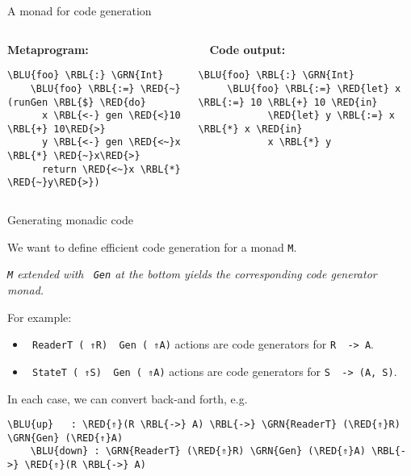 \documentclass[dvipsnames,aspectratio=169]{beamer}
\theoremstyle{remark}
\newcommand{\RED}[1]{{\color{BrickRed} #1}}
\newcommand{\GRN}[1]{{\color{OliveGreen} #1}}
\newcommand{\RBL}[1]{{\color{RoyalBlue} #1}}
\newcommand{\BLU}[1]{{\color{Blue} #1}}
\begin{document}
\begin{frame}[fragile]{A monad for code generation}

\begin{columns}
\begin{column}{0.4\textwidth}
\textbf{Metaprogram:}
\begin{Verbatim}[commandchars=\\\{\}]
    \BLU{foo} \RBL{:} \GRN{Int}
    \BLU{foo} \RBL{:=} \RED{~}(runGen \RBL{$} \RED{do}
      x \RBL{<-} gen \RED{<}10 \RBL{+} 10\RED{>}
      y \RBL{<-} gen \RED{<~}x \RBL{*} \RED{~}x\RED{>}
      return \RED{<~}x \RBL{*} \RED{~}y\RED{>})
\end{Verbatim}
\end{column}

\begin{column}{0.5\textwidth}
\textbf{$\hspace{1em}$Code output:}
\begin{Verbatim}[commandchars=\\\{\}]
     \BLU{foo} \RBL{:} \GRN{Int}
     \BLU{foo} \RBL{:=} \RED{let} x \RBL{:=} 10 \RBL{+} 10 \RED{in}
            \RED{let} y \RBL{:=} x \RBL{*} x \RED{in}
            x \RBL{*} y

\end{Verbatim}
\end{column}
\end{columns}

\end{frame}

\begin{frame}[fragile]{Generating monadic code}

We want to define efficient code generation for a monad \texttt{M}.
{\center
\begin{block}{}
\center\emph{\texttt{M} extended with \texttt{\GRN{Gen}} at the bottom yields
the corresponding code generator monad.}
\end{block}}

\vspace{1em}

For example:
\begin{itemize}
\item \texttt{\GRN{ReaderT} (\RED{⇑}R) \GRN{Gen} (\RED{⇑}A)} actions
      are code generators for \texttt{R \RBL{->} A}.
\item \texttt{\GRN{StateT} (\RED{⇑}S) \GRN{Gen} (\RED{⇑}A)} actions
      are code generators for \texttt{S \RBL{->} (A, S)}.
\end{itemize}
\vspace{0.5em}
In each case, we can convert back-and forth, e.g.\
\begin{Verbatim}[commandchars=\\\{\}]
    \BLU{up}   : \RED{⇑}(R \RBL{->} A) \RBL{->} \GRN{ReaderT} (\RED{⇑}R) \GRN{Gen} (\RED{⇑}A)
    \BLU{down} : \GRN{ReaderT} (\RED{⇑}R) \GRN{Gen} (\RED{⇑}A) \RBL{->} \RED{⇑}(R \RBL{->} A)
\end{Verbatim}

\end{frame}
\end{document}
